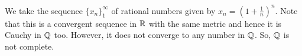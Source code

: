 
\begin{solution}
    We take the sequence $\{x_n\}_1^\infty$ of rational
    numbers given by
    $x_n=\left(1+\frac{1}{n}\right)^n$. Note that this
    is a convergent sequence in $\mathbb{R}$ with the same
    metric and hence it is
    Cauchy in $\mathbb{Q}$ too. However, it does not converge
    to any number in $\mathbb{Q}$. So, $\mathbb{Q}$ is not complete.
\end{solution}